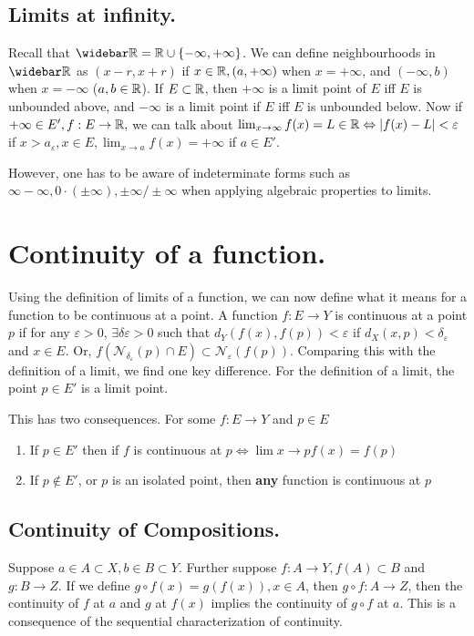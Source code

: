 \subsection{Limits at infinity.}
Recall that $\bar{\reals}=\reals\cup\{-\infty,+\infty\}$. We can define neighbourhoods in $\bar{\reals}$ as $(x-r,x+r)$ if $x\in\mathbb{R}, (a,+\infty)$ when $x=+\infty$, and $(-\infty,b)$ when $x=-\infty$ ($a,b\in\mathbb{R}$).
If $E\subset\mathbb{R}$, then $+\infty$ is a limit point of $E$ iff $E$ is unbounded above, and $-\infty$ is a limit point if $E$ iff $E$ is unbounded below.
Now if $+\infty\in E',f:E\to\mathbb{R},$ we can talk about $\lim_{x\to\infty}f(x)=L\in\mathbb{R}\Leftrightarrow \left\lvert f(x)-L\right\rvert<\varepsilon$ if $x>a_\varepsilon,x\in E,\lim_{x\to a}f(x)=+\infty$ if $a\in E'$.

However, one has to be aware of indeterminate forms such as $\infty-\infty,0\cdot(\pm\infty),\pm\infty/\pm\infty$ when applying algebraic properties to limits.

\section{Continuity of a function.}
Using the definition of limits of a function, we can now define what it means for a function to be continuous at a point.
A function $f:E\to Y$ is continuous at a point $p$ if for any $\varepsilon>0$, $\exists \delta\varepsilon >0$ such that $d_Y(f(x),f(p))< \varepsilon$ if $d_X(x,p)<\delta_\varepsilon$ and $x\in E$.
Or, $f\left(\mathcal{N}_{\delta_\varepsilon}(p)\cap E\right) \subset \mathcal{N}_\varepsilon(f(p))$.
Comparing this with the definition of a limit, we find one key difference.
For the definition of a limit, the point $p\in E'$ is a limit point.

This has two consequences.
For some $f:E\to Y$ and $p\in E$
\begin{enumerate}
\item If $p\in E'$ then if $f$ is continuous at $p \iff \lim{x\to p} f(x) = f(p)$
\item If $p\notin E'$, or $p$ is an isolated point, then \textbf{any} function is continuous at $p$
\end{enumerate}

\subsection{Continuity of Compositions.}
Suppose $a\in A\subset X, b\in B\subset Y$.
Further suppose $f:A\to Y, f(A)\subset B$ and $g:B\to Z$.
If we define $g\circ f (x)=g(f(x)), x\in A$, then $g\circ f:A\to Z$, then the continuity of $f$ at $a$ and $g$ at $f(x)$ implies the continuity of $g\circ f$ at $a$.
This is a consequence of the sequential characterization of continuity.


